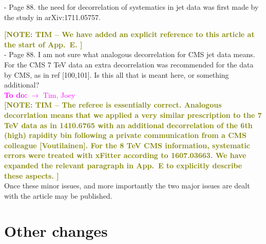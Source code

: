 \documentclass[aps,prd,amsmath,nofootinbib,floatfix,fleqn]{revtex4}
\newcommand{\TODO}[1]{\textcolor{magenta}{
\quad\vspace{3pt} \\ {\bf To do:} #1 \\
}}
\newcommand{\NOTETIM}[1]{\textcolor{olive}{ \bf[NOTE: TIM -- #1 ]}}
\begin{document}
- Page 88. the need for decorrelation of systematics in jet data was first made
by the study in  arXiv:1711.05757.

\NOTETIM{We have added an explicit reference to this article at the
start of App.~E.}\\
%

- Page 88. I am not sure what analogous decorrelation for CMS jet data means.
For the CMS 7 TeV data an extra decorrelation was recommended for the data by
CMS, as in ref [100,101]. Is this all that is meant here, or something
additional?
\TODO{$\to$ Tim, Joey}
%
\NOTETIM{The referee is essentially correct. Analogous decorrlation means that we
applied a very similar prescription to the 7 TeV data as in 1410.6765 with an
additional decorrelation of the 6th (high) rapidity bin following a private communication
from a CMS colleague [Voutilainen].  For the 8 TeV CMS information, systematic errors
were treated with xFitter according to 1607.03663.  We have expanded the relevant
paragraph in App.~E to explicitly describe these aspects.}\\

Once these minor issues, and more importantly the two major issues are dealt
with the article may be published.

\section{Other changes}
\end{document}
